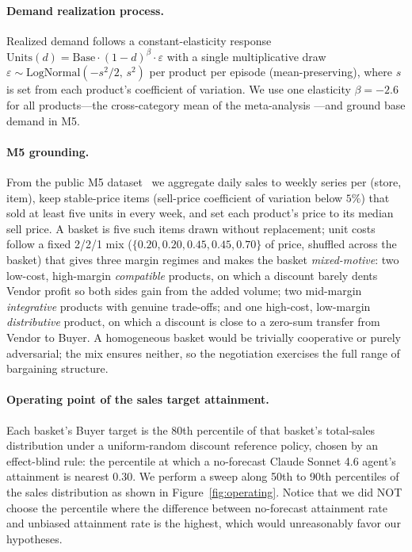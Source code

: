 \documentclass{article}
\begin{document}
\paragraph{Demand realization process.} Realized demand follows a constant-elasticity response $\text{Units}(d)=\text{Base}\cdot(1-d)^{\beta}\cdot\varepsilon$ with a single multiplicative draw $\varepsilon\sim\text{LogNormal}(-s^2/2,\,s^2)$ per product per episode (mean-preserving), where $s$ is set from each product's coefficient of variation. We use one elasticity $\beta=-2.6$ for all products---the cross-category mean of the meta-analysis \citep{bijmolt2005new}---and ground base demand in M5.

\paragraph{M5 grounding.} From the public M5 dataset~\citep{makridakis2022m5} we aggregate daily sales to weekly series per (store, item), keep stable-price items (sell-price coefficient of variation below $5\%$) that sold at least five units in every week, and set each product's price to its median sell price. A basket is five such items drawn without replacement; unit costs follow a fixed 2/2/1 mix ($\{0.20,0.20,0.45,0.45,0.70\}$ of price, shuffled across the basket) that gives three margin regimes and makes the basket \emph{mixed-motive}: two low-cost, high-margin \emph{compatible} products, on which a discount barely dents Vendor profit so both sides gain from the added volume; two mid-margin \emph{integrative} products with genuine trade-offs; and one high-cost, low-margin \emph{distributive} product, on which a discount is close to a zero-sum transfer from Vendor to Buyer. A homogeneous basket would be trivially cooperative or purely adversarial; the mix ensures neither, so the negotiation exercises the full range of bargaining structure.

\paragraph{Operating point of the sales target attainment.} Each basket's Buyer target is the $80$th percentile of that basket's total-sales distribution under a uniform-random discount reference policy, chosen by an effect-blind rule: the percentile at which a no-forecast Claude Sonnet 4.6 agent's attainment is nearest $0.30$. We perform a sweep along 50th to 90th percentiles of the sales distribution as shown in Figure~\ref{fig:operating}. Notice that we did NOT choose the percentile where the difference between no-forecast attainment rate and unbiased attainment rate is the highest, which would unreasonably favor our hypotheses.
\end{document}
